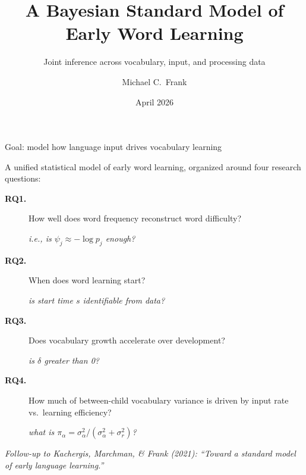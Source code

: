 \documentclass[aspectratio=169,t]{beamer}
\title{\bfseries A Bayesian Standard Model of Early Word Learning}
\subtitle{Joint inference across vocabulary, input, and processing data}
\author{Michael C.\ Frank}
\institute{\small Stanford University}
\date{April 2026}
\newcommand{\siga}{\sigma_{\alpha}}
\newcommand{\sigr}{\sigma_{r}}
\begin{document}
\begin{frame}[plain]
\titlepage
\end{frame}

\begin{frame}{Goal: model how language input drives vocabulary learning}

A unified statistical model of early word learning, organized around
four research questions:

\vspace{0.6em}
\begin{description}
\item[\textbf{RQ1.}] How well does word frequency reconstruct word
  difficulty? \par
  \emph{i.e., is $\psi_j \approx -\log p_j$ enough?}
\item[\textbf{RQ2.}] When does word learning start? \par
  \emph{is start time $s$ identifiable from data?}
\item[\textbf{RQ3.}] Does vocabulary growth accelerate over development?\par
  \emph{is $\delta$ greater than 0?}
\item[\textbf{RQ4.}] How much of between-child vocabulary variance is
  driven by input rate vs.\ learning efficiency? \par
  \emph{what is $\pi_\alpha = \siga^2 / (\siga^2 + \sigr^2)$?}
\end{description}

\vspace{0.6em}
\small
\textit{Follow-up to Kachergis, Marchman, \& Frank (2021):
``Toward a standard model of early language learning.''}

\end{frame}
\end{document}
